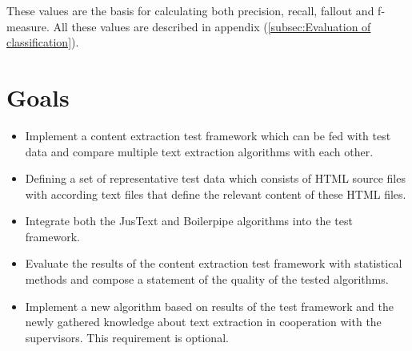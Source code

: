 These values are the basis for calculating  both precision, recall, fallout and f-measure. All these values are described in appendix (\ref{subsec:Evaluation of classification}).

\section{Goals}

\begin{itemize}
\item Implement a content extraction test framework which can be fed with test data and compare multiple text extraction algorithms with each other.
\item Defining a set of representative test data which consists of HTML source files with according text files that define the relevant content of these HTML files.
\item Integrate both the JusText and Boilerpipe algorithms into the test framework.
\item Evaluate the results of the content extraction test framework with statistical methods and compose a statement of the quality of the tested algorithms.
\item Implement a new algorithm based on results of the test framework and the newly gathered knowledge about text extraction in cooperation with the supervisors. This requirement is optional.
\end{itemize}
